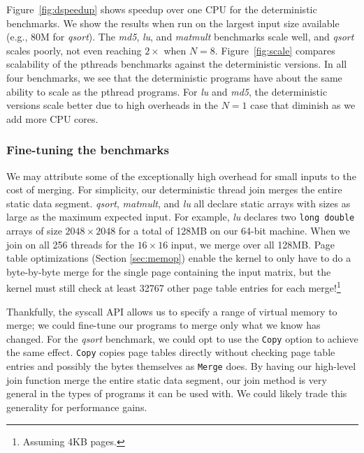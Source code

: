 \mbox{Figure \ref{fig:dspeedup}} shows speedup over one CPU for the
deterministic benchmarks. We show the
results when run on the largest input size available
(e.g., 80M for \emph{qsort}). The \emph{md5}, \emph{lu}, and \emph{matmult}
benchmarks scale well, and \emph{qsort} scales poorly, not even
reaching $2\times$ when $N=8$. \mbox{Figure \ref{fig:scale}} compares
scalability of the pthreads benchmarks against the deterministic versions.
In all four benchmarks, we see that the deterministic programs have about the
same ability to scale as the pthread programs. For \emph{lu} and \emph{md5},
the deterministic versions scale better due to high overheads in the $N=1$
case that diminish as we add more CPU cores.

\subsubsection{Fine-tuning the benchmarks}
\label{sec:finetune}
We may attribute some of the exceptionally high overhead for small inputs to
the cost of merging. For simplicity, our deterministic thread join merges the
entire static data segment. \emph{qsort}, \emph{matmult}, and \emph{lu} all
declare static arrays with sizes as large as the maximum expected input. For
example, \emph{lu} declares two {\tt long double} arrays of size
$2048\times 2048$ for a total of 128MB on our 64-bit machine. When we join on
all 256 threads for the $16\times 16$ input, we merge over all 128MB. Page
table optimizations (Section \ref{sec:memop}) enable the kernel to only have to
do a \mbox{byte-by-byte} merge for the single page containing the input matrix,
but the kernel must still check at least 32767 other page table
entries for each merge!\footnote{Assuming 4KB pages.}

Thankfully, the syscall API allows us to specify a range of virtual memory to
merge; we could fine-tune our programs to merge only what we know has changed.
For the \emph{qsort} benchmark, we could opt to use the {\tt Copy} option to
achieve the same effect. {\tt Copy} copies page tables directly without checking
page table entries and possibly the bytes themselves as {\tt Merge} does. By
having our high-level join function merge the entire static data segment, our
join method is very general in the types of programs it can be used with. We
could likely trade this generality for performance gains.



